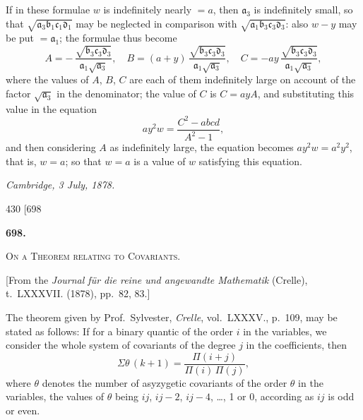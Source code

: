 \documentclass[11pt]{article}
\begin{document}
If in these formulae $w$ is indefinitely nearly $= a$, then $\mathfrak{a}_{3}$ is indefinitely small, so that $\sqrt{\mathfrak{a}_{3}\mathfrak{b}_{1}\mathfrak{c}_{1}\mathfrak{d}_{1}}$ may be neglected in comparison with $\sqrt{\mathfrak{a}_{1}\mathfrak{b}_{3}\mathfrak{c}_{3}\mathfrak{d}_{3}}$: also $w - y$ may be put $= \mathfrak{a}_{1}$; the formulae thus become
\[ A = -\,\frac{\sqrt{\mathfrak{b}_{3}\mathfrak{c}_{3}\mathfrak{d}_{3}}}{\mathfrak{a}_{1}\sqrt{\mathfrak{a}_{3}}},\quad B = (a + y)\,\frac{\sqrt{\mathfrak{b}_{3}\mathfrak{c}_{3}\mathfrak{d}_{3}}}{\mathfrak{a}_{1}\sqrt{\mathfrak{a}_{3}}},\quad C = -ay\,\frac{\sqrt{\mathfrak{b}_{3}\mathfrak{c}_{3}\mathfrak{d}_{3}}}{\mathfrak{a}_{1}\sqrt{\mathfrak{a}_{3}}}, \]
where the values of $A$, $B$, $C$ are each of them indefinitely large on account of the factor $\sqrt{\mathfrak{a}_{3}}$ in the denominator; the value of $C$ is $C = ay A$, and substituting this value in the equation
\[ ay^{2}w = \frac{C^{2} - abcd}{A^{2} - 1}, \]
and then considering $A$ as indefinitely large, the equation becomes $ay^{2}w = a^{2}y^{2}$, that is, $w = a$; so that $w = a$ is a value of $w$ satisfying this equation.

\medskip
\noindent\textit{Cambridge, 3 July, 1878.}

\clearpage
\begin{center}\small 430 \hfill [698\end{center}

\bigskip
\begin{center}\textbf{\large 698.}\end{center}

\bigskip
\begin{center}\textsc{On a Theorem relating to Covariants.}\end{center}

\begin{center}\small [From the \textit{Journal f\"{u}r die reine und angewandte Mathematik} (Crelle), t.~LXXXVII. (1878), pp.~82, 83.]\end{center}

The theorem given by Prof.~Sylvester, \textit{Crelle}, vol.~LXXXV., p.~109, may be stated as follows: If for a binary quantic of the order $i$ in the variables, we consider the whole system of covariants of the degree $j$ in the coefficients, then
\[ \Sigma\theta\,(k + 1) = \frac{\Pi(i + j)}{\Pi(i)\,\Pi(j)}, \]
where $\theta$ denotes the number of asyzygetic covariants of the order $\theta$ in the variables, the values of $\theta$ being $ij$, $ij - 2$, $ij - 4$, \dots, 1 or 0, according as $ij$ is odd or even.
\end{document}
